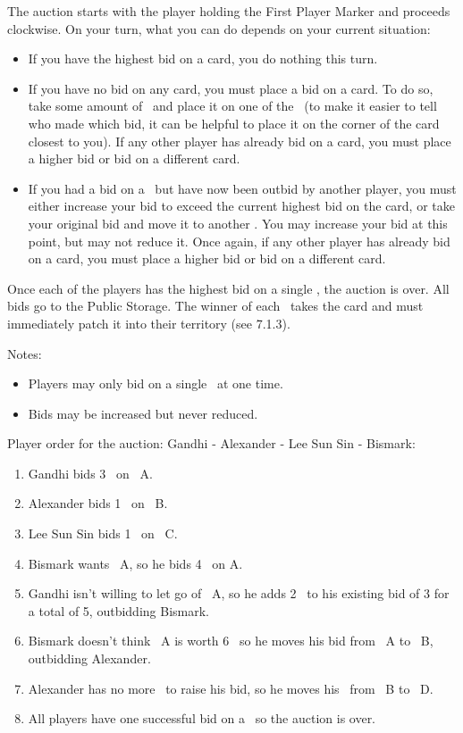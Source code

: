 \documentclass[10pt,twocolumn]{article}
\begin{document}
The auction starts with the player holding the First Player Marker and proceeds clockwise. On your turn, what you can do depends on your current situation:
\begin{itemize}
\item If you have the highest bid on a card, you do nothing this turn.
\item If you have no bid on any card, you must place a bid on a card. To do so, take some amount of \money\ and place it on one of the \landcards\ (to make it easier to tell who made which bid, it can be helpful to place it on the corner of the card closest to you). If any other player has already bid on a card, you must place a higher bid or bid on a different card.
\item If you had a bid on a \landcard\ but have now been outbid by another player, you must either increase your bid to exceed the current highest bid on the card, or take your original bid and move it to another \landcard. You may increase your bid at this point, but may not reduce it. Once again, if any other player has already bid on a card, you must place a higher bid or bid on a different card.
\end{itemize}
Once each of the players has the highest bid on a single \landcard, the auction is over. All bids go to the Public Storage. The winner of each \landcard\ takes the card and must immediately patch it into their territory (see 7.1.3).

Notes:
\begin{itemize}
\item Players may only bid on a single \landcard\ at one time.
\item Bids may be increased but never reduced.
\end{itemize}
\begin{BoxExample}
Player order for the auction: Gandhi - Alexander - Lee Sun Sin - Bismark:
\begin{enumerate}
\item Gandhi bids 3 \money\ on \landcard\ A.
\item Alexander bids 1 \money\ on \landcard\ B.
\item Lee Sun Sin bids 1 \money\ on \landcard\ C.
\item Bismark wants \landcard\ A, so he bids 4 \money\ on A.
\item Gandhi isn't willing to let go of \landcard\ A, so he adds 2 \money\ to his existing bid of 3 for a total of 5, outbidding Bismark.
\item Bismark doesn't think \landcard\ A is worth 6 \money\ so he moves his bid from \landcard\ A to \landcard\ B, outbidding Alexander.
\item Alexander has no more \money\ to raise his bid, so he moves his \money\ from \landcard\ B to \landcard\ D.
\item All players have one successful bid on a \landcard\ so the auction is over.
\end{enumerate}
\end{BoxExample}
\end{document}
